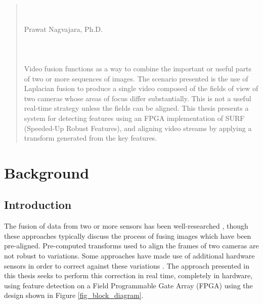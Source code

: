 \documentclass{article}
\begin{document}
\setcounter{page}{2}
\begin{center}
    \tableofcontents
    \clearpage
    
    \listoftables
    \clearpage
    
    \listoffigures
\end{center}
\clearpage

\hfill \\
\hfill \\
\hfill \\
\hfill \\


\begin{abstract}
    \singlespacing
    \centering
    \thetitle \\
    \theauthor \\
    Prawat Nagvajara, Ph.D. \\
    
    \hfill \\
    \hfill \\
    \hfill \\
    
    \doublespacing
    Video fusion functions as a way to combine the important or useful parts of two or more sequences of images. The scenario presented is the use of Laplacian fusion to produce a single video composed of the fields of view of two cameras whose areas of focus differ substantially. This is not a useful real-time strategy unless the fields can be aligned. This thesis presents a system for detecting features using an FPGA implementation of SURF (Speeded-Up Robust Features), and aligning video streams by applying a transform generated from the key features. 
\end{abstract}

\clearpage


\section{Background}

\subsection{Introduction}

The fusion of data from two or more sensors has been well-researched \cite{wang_multi-focus_2011} \cite{li_multi-sensor_1994}, though these approaches typically discuss the process of fusing images which have been pre-aligned. Pre-computed transforms used to align the frames of two cameras are not robust to variations. Some approaches have made use of additional hardware sensors in order to correct against these variations \cite{chappell_exploiting_2006}. The approach presented in this thesis seeks to perform this correction in real time, completely in hardware, using feature detection on a Field Programmable Gate Array (FPGA) using the design shown in Figure \ref{fig_block_diagram}.
\end{document}
